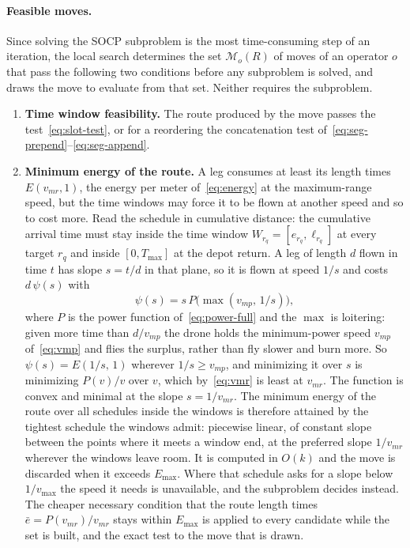 \paragraph{Feasible moves.}
Since solving the SOCP subproblem is the most time-consuming step of an iteration, the local search determines the set $\mathcal{M}_o(R)$ of moves of an operator $o$ that pass the following two conditions before any subproblem is solved, and draws the move to evaluate from that set. Neither requires the subproblem.
\begin{enumerate}[noitemsep, topsep=4pt, leftmargin=2em]
    \item \textbf{Time window feasibility.} The route produced by the move passes the test~\eqref{eq:slot-test}, or for a reordering the concatenation test of~\eqref{eq:seg-prepend}--\eqref{eq:seg-append}.
    \item \textbf{Minimum energy of the route.} A leg consumes at least its length times $E(v_{mr}, 1)$, the energy per meter of~\eqref{eq:energy} at the maximum-range speed, but the time windows may force it to be flown at another speed and so to cost more. Read the schedule in cumulative distance: the cumulative arrival time must stay inside the time window $W_{r_q} = [e_{r_q}, \ell_{r_q}]$ at every target $r_q$ and inside $[0, T_{\max}]$ at the depot return. A leg of length $d$ flown in time $t$ has slope $s = t/d$ in that plane, so it is flown at speed $1/s$ and costs $d\,\psi(s)$ with
    \begin{equation}\label{eq:psi}
        \psi(s) = s\, P\!\bigl(\max(v_{mp},\, 1/s)\bigr),
    \end{equation}
    where $P$ is the power function of~\eqref{eq:power-full} and the $\max$ is loitering: given more time than $d/v_{mp}$ the drone holds the minimum-power speed $v_{mp}$ of~\eqref{eq:vmp} and flies the surplus, rather than fly slower and burn more. So $\psi(s) = E(1/s,\, 1)$ wherever $1/s \ge v_{mp}$, and minimizing it over $s$ is minimizing $P(v)/v$ over $v$, which by~\eqref{eq:vmr} is least at $v_{mr}$. The function is convex and minimal at the slope $s = 1/v_{mr}$. The minimum energy of the route over all schedules inside the windows is therefore attained by the tightest schedule the windows admit: piecewise linear, of constant slope between the points where it meets a window end, at the preferred slope $1/v_{mr}$ wherever the windows leave room. It is computed in $O(k)$ and the move is discarded when it exceeds $E_{\max}$. Where that schedule asks for a slope below $1/v_{\max}$ the speed it needs is unavailable, and the subproblem decides instead. The cheaper necessary condition that the route length times $\bar{e} = P(v_{mr})/v_{mr}$ stays within $E_{\max}$ is applied to every candidate while the set is built, and the exact test to the move that is drawn.
\end{enumerate}
